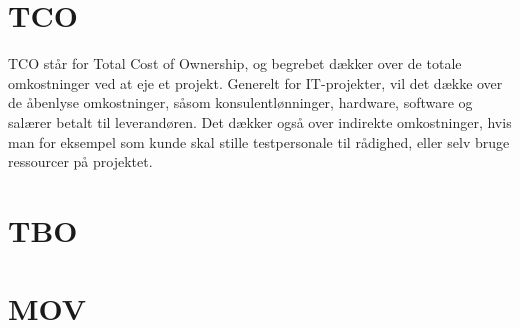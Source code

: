 \documentclass[12pt,a4paper,oneside]{article}
\begin{document}
  \section{TCO}
TCO står for Total Cost of Ownership, og begrebet dækker over de totale
omkostninger ved at eje et projekt. Generelt for IT-projekter, vil det dække
over de åbenlyse omkostninger, såsom konsulentlønninger, hardware, software og
salærer betalt til leverandøren. Det dækker også over indirekte omkostninger,
hvis man for eksempel som kunde skal stille testpersonale til rådighed, eller
selv bruge ressourcer på projektet.

  \section{TBO}


  \section{MOV}
\end{document}
